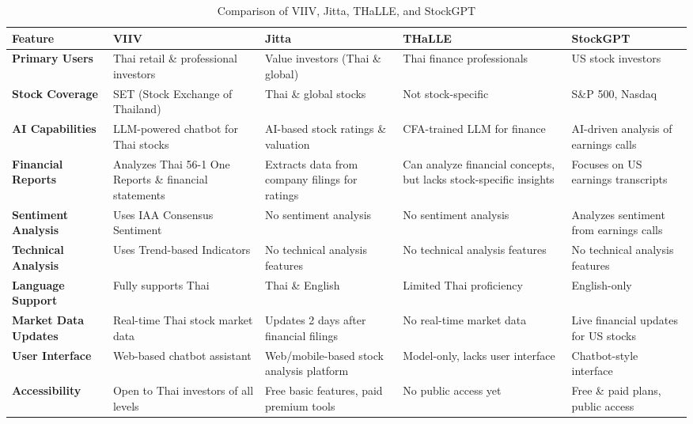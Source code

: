 \begin{table}[h]
    \small
    \renewcommand{\arraystretch}{1.5}
    \caption{Comparison of VIIV, Jitta, THaLLE, and StockGPT}
    \label{tab:comparison}
    \begin{tabularx}{\textwidth}{|>{\raggedright\arraybackslash}X|>{\raggedright\arraybackslash}X|>{\raggedright\arraybackslash}X|>{\raggedright\arraybackslash}X|>{\raggedright\arraybackslash}X|}
        \hline
        \textbf{Feature} & \textbf{VIIV} & \textbf{Jitta} & \textbf{THaLLE} & \textbf{StockGPT} \\
        \hline
        \textbf{Primary Users} & Thai retail \& professional investors & Value investors (Thai \& global) & Thai finance professionals & US stock investors \\
        \hline
        \textbf{Stock Coverage} & SET (Stock Exchange of Thailand) & Thai \& global stocks & Not stock-specific & S\&P 500, Nasdaq \\
        \hline
        \textbf{AI Capabilities} & LLM-powered chatbot for Thai stocks & AI-based stock ratings \& valuation & CFA-trained LLM for finance & AI-driven analysis of earnings calls \\
        \hline
        \textbf{Financial Reports} & Analyzes Thai 56-1 One Reports \& financial statements & Extracts data from company filings for ratings & Can analyze financial concepts, but lacks stock-specific insights & Focuses on US earnings transcripts \\
        \hline
        \textbf{Sentiment Analysis} & Uses IAA Consensus Sentiment & No sentiment analysis & No sentiment analysis & Analyzes sentiment from earnings calls \\
        \hline
        \textbf{Technical Analysis} & Uses Trend-based Indicators & No technical analysis features & No technical analysis features & No technical analysis features \\
        \hline
        \textbf{Language Support} & Fully supports Thai & Thai \& English & Limited Thai proficiency & English-only \\
        \hline
        \textbf{Market Data Updates} & Real-time Thai stock market data & Updates 2 days after financial filings & No real-time market data & Live financial updates for US stocks \\
        \hline
        \textbf{User Interface} & Web-based chatbot assistant & Web/mobile-based stock analysis platform & Model-only, lacks user interface & Chatbot-style interface \\
        \hline
        \textbf{Accessibility} & Open to Thai investors of all levels & Free basic features, paid premium tools & No public access yet & Free \& paid plans, public access \\
        \hline
    \end{tabularx}
\end{table}
